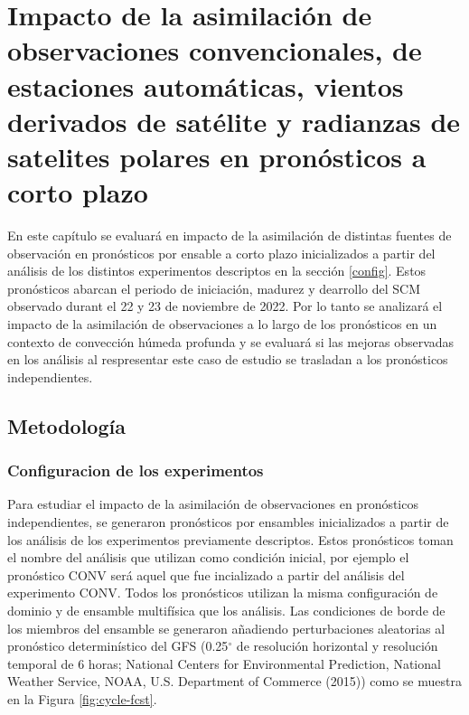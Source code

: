 \documentclass[12pt,oneside]{reedthesis}
\begin{document}
\hypertarget{impacto-de-la-asimilaciuxf3n-de-observaciones-convencionales-de-estaciones-automuxe1ticas-vientos-derivados-de-satuxe9lite-y-radianzas-de-satelites-polares-en-pronuxf3sticos-a-corto-plazo}{%
\chapter{Impacto de la asimilación de observaciones convencionales, de estaciones automáticas, vientos derivados de satélite y radianzas de satelites polares en pronósticos a corto plazo}\label{impacto-de-la-asimilaciuxf3n-de-observaciones-convencionales-de-estaciones-automuxe1ticas-vientos-derivados-de-satuxe9lite-y-radianzas-de-satelites-polares-en-pronuxf3sticos-a-corto-plazo}}

En este capítulo se evaluará en impacto de la asimilación de distintas fuentes de observación en pronósticos por ensable a corto plazo inicializados a partir del análisis de los distintos experimentos descriptos en la sección \ref{config}. Estos pronósticos abarcan el periodo de iniciación, madurez y dearrollo del SCM observado durant el 22 y 23 de noviembre de 2022. Por lo tanto se analizará el impacto de la asimilación de observaciones a lo largo de los pronósticos en un contexto de convección húmeda profunda y se evaluará si las mejoras observadas en los análisis al respresentar este caso de estudio se trasladan a los pronósticos independientes.

\hypertarget{metodologuxeda-1}{%
\section{Metodología}\label{metodologuxeda-1}}

\hypertarget{configuracion-de-los-experimentos}{%
\subsection{Configuracion de los experimentos}\label{configuracion-de-los-experimentos}}

Para estudiar el impacto de la asimilación de observaciones en pronósticos independientes, se generaron pronósticos por ensambles inicializados a partir de los análisis de los experimentos previamente descriptos. Estos pronósticos toman el nombre del análisis que utilizan como condición inicial, por ejemplo el pronóstico CONV será aquel que fue incializado a partir del análisis del experimento CONV. Todos los pronósticos utilizan la misma configuración de dominio y de ensamble multifísica que los análisis. Las condiciones de borde de los miembros del ensamble se generaron añadiendo perturbaciones aleatorias al pronóstico determinístico del GFS (0.25\(^{\circ}\) de resolución horizontal y resolución temporal de 6 horas; National Centers for Environmental Prediction, National Weather Service, NOAA, U.S. Department of Commerce (2015)) como se muestra en la Figura \ref{fig:cycle-fcst}.
\end{document}
